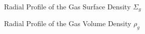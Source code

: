 \begin{figure}[h!]
    \caption{Radial Profile of the Gas Surface Density $\Sigma_g$}
    \label{}
\end{figure}

\begin{figure}[h!]
    \caption{Radial Profile of the Gas Volume Density $\rho_g$}
    \label{}
\end{figure}
